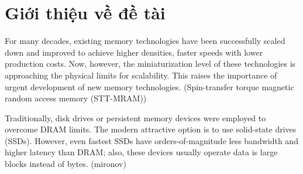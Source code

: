 \section{Giới thiệu về đề tài}
\label{sec:introduction}

For many decades, existing memory technologies have been successfully scaled
down and improved to achieve higher densities, faster speeds with lower
production costs.  Now, however, the miniaturization level of these
technologies is approaching the physical limits for scalability. This raises
the importance of urgent development of new memory technologies. (Spin-transfer torque magnetic random access memory (STT-MRAM))

Traditionally, disk drives or persistent memory devices were 
employed to overcome DRAM limits. The modern attractive 
option is to use solid-state drives (SSDs). However, even fastest 
SSDs have orders-of-magnitude less bandwidth and higher 
latency than DRAM; also, these devices usually operate data is 
large blocks instead of bytes. (mironov)